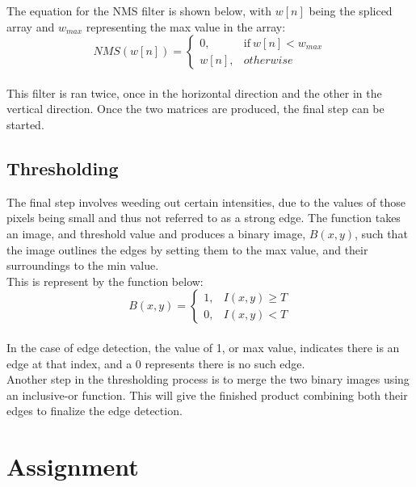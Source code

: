 \documentclass{article}
\begin{document}
	 The equation for the NMS filter is shown below, with $w[n]$ being the spliced array and $w_{max}$ representing the max value in the array:\\
	 
	 \begin{equation}
	 NMS(w[n]) = \begin{cases} 
	 0, & \mbox{if}\ w[n] < w_{max}\\
	 w[n], & otherwise 
	 \end{cases} 
	 \end{equation}
	 \\
	
	This filter is ran twice, once in the horizontal direction and the other in the vertical direction. Once the two matrices are produced, the final step can be started.
	
	\subsection{Thresholding}
	
	The final step involves weeding out certain intensities, due to the values of those pixels being small and thus not referred to as a strong edge. The function takes an image, and threshold value and produces a binary image, $B(x,y)$, such that the image outlines the edges by setting them to the max value, and their surroundings to the min value.\\
	
	This is represent by the function below:\\
	
	\begin{equation}
		B(x,y) = \begin{cases} 
		1, & I(x,y) \geq T\\
		0, & I(x,y) < T
		\end{cases} 
	\end{equation}\\
	
	In the case of edge detection, the value of 1, or max value, indicates there is an edge at that index, and a 0 represents there is no such edge.\\
	
	Another step in the thresholding process is to merge the two binary images using an inclusive-or function. This will give the finished product combining both their edges to finalize the edge detection.
	
	\section{Assignment}
	
\end{document}
